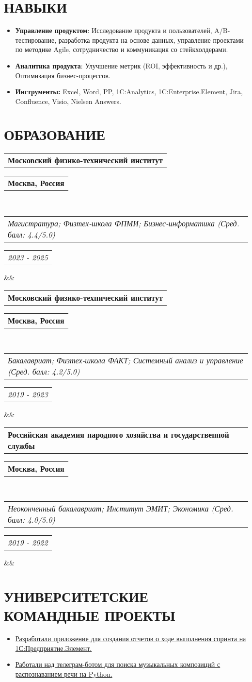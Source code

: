 \documentclass[11pt,a4paper,sans]{moderncv}        %
\makeatletter
\newcommand*{\customcventry}[7][.25em]{
  \begin{tabular}{@{}l} 
    {\bfseries #4}
  \end{tabular}
  \hfill%
  \begin{tabular}{l@{}}
     {\bfseries #5}
  \end{tabular} \\
  \begin{tabular}{@{}l} 
    {\itshape #3}
  \end{tabular}
  \hfill%
  \begin{tabular}{l@{}}
     {\itshape #2}
  \end{tabular}
  \ifx&#7&%
  \else{\\%
    \begin{minipage}{\maincolumnwidth}%
      \small#7%
    \end{minipage}}\fi%
  \par\addvspace{#1}}
\makeatother
\begin{document}
\section{НАВЫКИ}
\begin{itemize}
\item \textbf{Управление продуктом}: Исследование продукта и пользователей, A/B-тестирование, разработка продукта на основе данных, управление проектами по методике Agile, сотрудничество и коммуникация со стейкхолдерами.
\item \textbf{Аналитика продукта}: Улучшение метрик (ROI, эффективность и др.), Оптимизация бизнес-процессов.
\item \textbf{Инструменты:} Excel, Word, PP, 1C:Analytics, 1C:Enterprise.Element, Jira, Confluence, Visio, Nielsen Answers.
\end{itemize}

\section{ОБРАЗОВАНИЕ}
{\customcventry{2023 - 2025}{Магистратура; Физтех-школа ФПМИ; Бизнес-информатика (Сред. балл: 4.4/5.0)}{Московский физико-технический институт}{Москва, Россия}{}{}}
{\customcventry{2019 - 2023}{Бакалавриат; Физтех-школа ФАКТ; Системный анализ и управление (Сред. балл: 4.2/5.0)}{Московский физико-технический институт}{Москва, Россия}{}{}}
{\customcventry{2019 - 2022}{Неоконченный бакалавриат; Институт ЭМИТ; Экономика (Сред. балл: 4.0/5.0)}{Российская академия народного хозяйства и государственной службы}{Москва, Россия}{}{}}

\section{УНИВЕРСИТЕТСКИЕ КОМАНДНЫЕ ПРОЕКТЫ}
{
  {\begin{itemize}
  \item \href{https://disk.yandex.com/d/EUMrDL89-MqzmQ}{Разработали приложение для создания отчетов о ходе выполнения спринта на 1С:Предприятие.Элемент.}
  \item \href{https://github.com/alievgithub/SpeechRecognitionBot}{Работали над телеграм-ботом для поиска музыкальных композиций с распознаванием речи на Python.}
  \end{itemize}
  }
}



\end{document}
